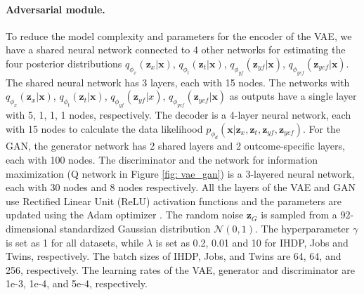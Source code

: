\documentclass{amia}
\begin{document}
\paragraph{Adversarial module.} To reduce the model complexity and parameters for the encoder of the VAE, we have a shared neural network connected to 4 other networks for estimating the four posterior distributions $q_{\phi_x}(\textbf{z}_x|\textbf{x})$, $q_{\phi_t}(\textbf{z}_t|\textbf{x})$, $q_{\phi_{yf}}(\textbf{z}_{yf}|\textbf{x})$, $q_{\phi_{ycf}}(\textbf{z}_{ycf}|\textbf{x})$. The shared neural network has 3 layers, each with 15 nodes. The networks with $q_{\phi_x}(\textbf{z}_x|\textbf{x})$, $q_{\phi_t}(\textbf{z}_t|\textbf{x})$, $q_{\phi_{yf}}(\textbf{z}_{yf}|x)$, $q_{\phi_{ycf}}(\textbf{z}_{ycf}|\textbf{x})$ as outputs have a single layer with 5, 1, 1, 1 nodes, respectively. The decoder is a 4-layer neural network, each with 15 nodes to calculate the data likelihood $p_{\phi_d}(\textbf{x}|\textbf{z}_x, \textbf{z}_t, \textbf{z}_{yf}, \textbf{z}_{ycf})$. For the GAN, the generator network has 2 shared layers and 2 outcome-specific layers, each with 100 nodes. The discriminator and the network for information maximization (Q network in Figure \ref{fig: vae_gan}) is a 3-layered neural network, each with 30 nodes and 8 nodes respectively. All the layers of the VAE and GAN use Rectified Linear Unit (ReLU) activation functions and the parameters are updated using the Adam optimizer \cite{kingma2014adam}. The random noise $\textbf{z}_G$ is sampled from a 92-dimensional standardized Gaussian distribution $\mathcal{N}(0,1)$. The hyperparameter $\gamma$ is set as 1 for all datasets, while $\lambda$ is set as 0.2, 0.01 and 10 for IHDP, Jobs and Twins, respectively. The batch sizes of IHDP, Jobs, and Twins are 64, 64, and 256, respectively. The learning rates of the VAE, generator and discriminator are 1e-3, 1e-4, and 5e-4, respectively.
\end{document}
